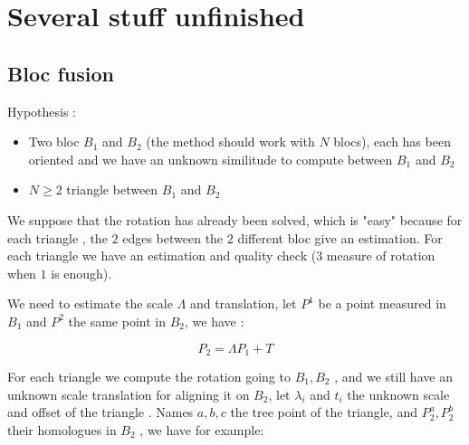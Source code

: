 

\chapter{Several stuff unfinished}





\section{Bloc fusion}

Hypothesis :

\begin{itemize}
    \item Two bloc $B_1$ and $B_2$  (the method should work with $N$ blocs),
          each has been oriented and we have an unknown similitude to compute between $B_1$ and $B_2$

    \item $N\geq 2$ triangle between $B_1$ and $B_2$
\end{itemize}

We suppose that the rotation has already been solved, which is "easy" because for each triangle ,
the $2$ edges between the $2$ different bloc give an estimation.  For each triangle we have an estimation
and quality check ($3$ measure of rotation when $1$ is enough). 

We need to estimate the scale $\Lambda$ and translation,
let $P^1$  be a point measured in $B_1$ and $P^2$ the same point in $B_2$, 
we have :

\begin{equation}
	P_2 = \Lambda P_1 + T \label{Eq:Bloc12}
\end{equation}

For each triangle we compute the rotation going to $B_1,B_2$ , and we still
have an unknown scale translation for aligning it on $B_2$,
let $\lambda_i$ and $t_i$  the unknown scale and offset of the triangle .
Names $a,b,c$ the tree point of the triangle,  and $P^a_2, P^b_2 $ their homologues
in  $B_2$ , we have for example:

